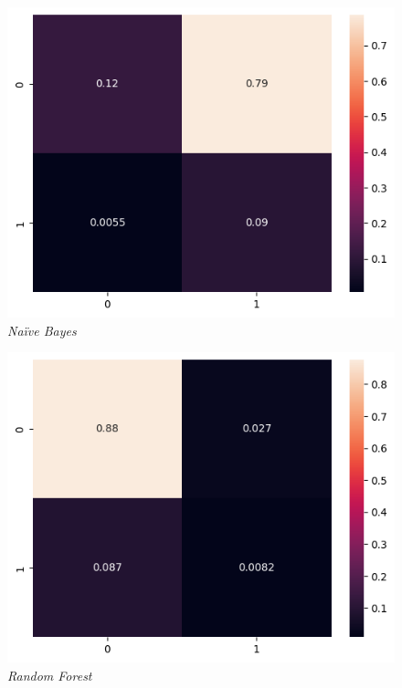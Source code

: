 \documentclass[12pt, a4paper]{article}
\begin{document}
    	\begin{figure}[H]
    		\centering
    		\begin{minipage}[b]{0.46\textwidth}    				
        		\centering
        		\includegraphics[width=\textwidth]{classification/complete_nb_confusion.png}
        		\textit{\small Na\"ive Bayes}
    		\end{minipage}
    		\hfill
    		\begin{minipage}[b]{0.46\textwidth}
        		\centering
        		\includegraphics[width=\textwidth]{classification/complete_rf_confusion.png}
        		\textit{\small Random Forest}

\end{minipage}
\end{figure}
\end{document}
